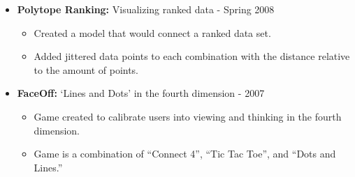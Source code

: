 \documentclass[oneside]{article}
\begin{document}
\begin{itemize}
% 

\item{\bf Polytope Ranking:} Visualizing ranked data - Spring 2008
\begin{itemize}
  \item Created a model that would connect a ranked data set.
  \item Added jittered data points to each combination with the distance relative to the amount of points.
\end{itemize}


\item{\bf FaceOff:} `Lines and Dots' in the fourth dimension - 2007
\begin{itemize}
  \item Game created to calibrate users into viewing and thinking in the fourth dimension.
  \item Game is a combination of  ``Connect 4'', ``Tic Tac Toe'', and ``Dots and Lines.''
\end{itemize}

% 




\end{itemize}
\end{document}
